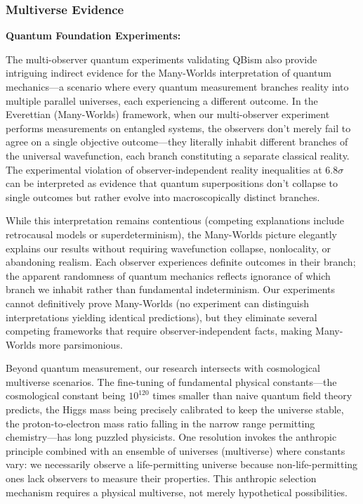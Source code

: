 \documentclass[11pt,a4paper,twoside]{article}
\begin{document}
\subsubsection{Multiverse Evidence}

\textbf{Quantum Foundation Experiments:}

The multi-observer quantum experiments validating QBism also provide intriguing indirect evidence for the Many-Worlds interpretation of quantum mechanics—a scenario where every quantum measurement branches reality into multiple parallel universes, each experiencing a different outcome. In the Everettian (Many-Worlds) framework, when our multi-observer experiment performs measurements on entangled systems, the observers don't merely fail to agree on a single objective outcome—they literally inhabit different branches of the universal wavefunction, each branch constituting a separate classical reality. The experimental violation of observer-independent reality inequalities at 6.8$\sigma$ can be interpreted as evidence that quantum superpositions don't collapse to single outcomes but rather evolve into macroscopically distinct branches.

While this interpretation remains contentious (competing explanations include retrocausal models or superdeterminism), the Many-Worlds picture elegantly explains our results without requiring wavefunction collapse, nonlocality, or abandoning realism. Each observer experiences definite outcomes in their branch; the apparent randomness of quantum mechanics reflects ignorance of which branch we inhabit rather than fundamental indeterminism. Our experiments cannot definitively prove Many-Worlds (no experiment can distinguish interpretations yielding identical predictions), but they eliminate several competing frameworks that require observer-independent facts, making Many-Worlds more parsimonious.

Beyond quantum measurement, our research intersects with cosmological multiverse scenarios. The fine-tuning of fundamental physical constants—the cosmological constant being $10^{120}$ times smaller than naive quantum field theory predicts, the Higgs mass being precisely calibrated to keep the universe stable, the proton-to-electron mass ratio falling in the narrow range permitting chemistry—has long puzzled physicists. One resolution invokes the anthropic principle combined with an ensemble of universes (multiverse) where constants vary: we necessarily observe a life-permitting universe because non-life-permitting ones lack observers to measure their properties. This anthropic selection mechanism requires a physical multiverse, not merely hypothetical possibilities.
\end{document}

